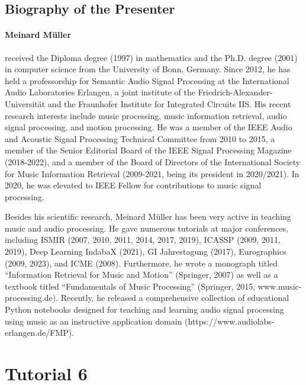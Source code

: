 \subsection*{Biography of the Presenter}
\paragraph{Meinard Müller} received the Diploma degree (1997) in mathematics and the Ph.D. degree (2001) in computer science from the University of Bonn, Germany. Since 2012, he has held a professorship for Semantic Audio Signal Processing at the International Audio Laboratories Erlangen, a joint institute of the Friedrich-Alexander-Universität and the Fraunhofer Institute for Integrated Circuits IIS. His recent research interests include music processing, music information retrieval, audio signal processing, and motion processing. He was a member of the IEEE Audio and Acoustic Signal Processing Technical Committee from 2010 to 2015, a member of the Senior Editorial Board of the IEEE Signal Processing Magazine (2018-2022), and a member of the Board of Directors of the International Society for Music Information Retrieval (2009-2021, being its president in 2020/2021). In 2020, he was elevated to IEEE Fellow for contributions to music signal processing.

Besides his scientific research, Meinard Müller has been very active in teaching music and audio processing. He gave numerous tutorials at major conferences, including ISMIR (2007, 2010, 2011, 2014, 2017, 2019), ICASSP (2009, 2011, 2019), Deep Learning IndabaX (2021), GI Jahrestagung (2017), Eurographics (2009, 2023), and ICME (2008). Furthermore, he wrote a monograph titled ``Information Retrieval for Music and Motion'' (Springer, 2007) as well as a textbook titled ``Fundamentals of Music Processing'' (Springer, 2015, www.music-processing.de). Recently, he released a comprehensive collection of educational Python notebooks designed for teaching and learning audio signal processing using music as an instructive application domain (https://www.audiolabs-erlangen.de/FMP).

\clearpage


\section*{Tutorial 6}
{}
%
